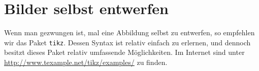 \documentclass[a0paper,noDIN,Mathematik]{tudmathposter}
\begin{document}
\section{Bilder selbst entwerfen}

Wenn man gezwungen ist, mal eine Abbildung selbst zu entwerfen, so empfehlen wir das Paket \texttt{tikz}. Dessen Syntax ist relativ einfach zu erlernen, und dennoch besitzt dieses Paket relativ umfassende Möglichkeiten. Im Internet sind unter \url{http://www.texample.net/tikz/examples/} zu finden.

\end{document}
